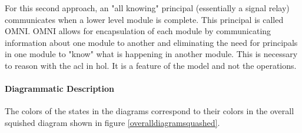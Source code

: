\documentclass[../../main/main.tex]{subfiles}
\begin{document}
For this second approach, an "all knowing" principal (essentially a signal relay) communicates when a lower level module is complete.  This principal is called OMNI. OMNI allows for encapsulation of each module by communicating information about one module to another and eliminating the need for principals in one module to "know" what is happening in another module.  This is necessary to reason with the \gls{acl} in \gls{hol}.  It is a feature of the model and not the operations.

%
%

%
%

\paragraph*{Diagrammatic Description}
The colors of the states in the diagrams correspond to their colors in the overall squished diagram shown in figure \ref{overalldiagramsquashed}.  
\end{document}
